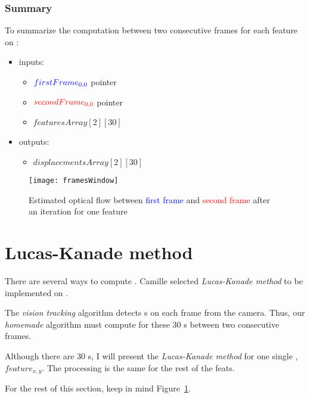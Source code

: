 \subsubsection{Summary}

To summarize the \flow{} computation between two consecutive frames for each feature on \vc:
\begin{itemize}
	\item inputs:
		\begin{itemize}
			\item $\textcolor{blue}{firstFrame_{0,0}}$ pointer
			\item $\textcolor{red}{secondFrame_{0,0}}$ pointer
			\item {} $featuresArray[2][30]$
		\end{itemize}
	\item outputs:
		\begin{itemize}
			\item {} $displacementsArray[2][30]$
		\end{itemize}
\end{itemize}

\begin{figure}[!htbp]
	\centering
	\texttt{[image: framesWindow]}
	\caption{Estimated optical flow between \textcolor{blue}{first frame} and \textcolor{red}{second frame} after an iteration for one feature}
	\label{framesWindowFig}
\end{figure}
\FloatBarrier


\section{Lucas-Kanade method}

There are several ways to compute \flow{}. Camille selected \emph{Lucas-Kanade method} to be implemented on \vc.

The \emph{vision tracking} algorithm detects  \feat{}s on each frame from the camera. Thus, our \emph{homemade} algorithm must compute \flow{} for these 30 \feat{}s between two consecutive frames.

Although there are 30 \feat{}s, I will present the \emph{Lucas-Kanade method} for one single \feat{}, $feature_{x,y}$. The processing is the same for the rest of the feat{}s.

For the rest of this section, keep in mind Figure~\ref{framesWindowFig}.

